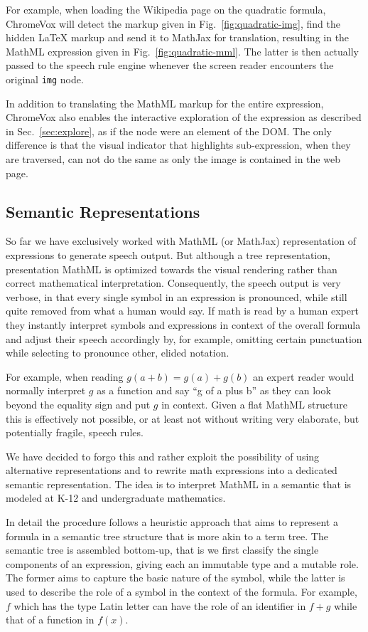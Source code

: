 \documentclass{sig-alternate}
\begin{document}
For example, when loading the Wikipedia page on the quadratic formula, ChromeVox
will detect the markup given in Fig.~\ref{fig:quadratic-img}, find the hidden
{\LaTeX} markup and send it to MathJax for translation, resulting in the MathML
expression given in Fig.~\ref{fig:quadratic-mml}. The latter is then actually
passed to the speech rule engine whenever the screen reader encounters the
original \texttt{img} node.

In addition to translating the MathML markup for the entire expression,
ChromeVox also enables the interactive exploration of the expression as
described in Sec.~\ref{sec:explore}, as if the node were an element of the
DOM. The only difference is that the visual indicator that highlights
sub-expression, when they are traversed, can not do the same as only the image is
contained in the web page.


\subsection{Semantic Representations}
\label{sec:semantic}

So far we have exclusively worked with MathML (or MathJax) representation of
expressions to generate speech output. But although a tree representation,
presentation MathML is optimized towards the visual rendering rather than
correct mathematical interpretation.  Consequently, the speech output is very
verbose, in that every single symbol in an expression is pronounced, while still
quite removed from what a human would say. If math is read by a human
expert they instantly interpret symbols and expressions in context of the
overall formula and adjust their speech accordingly by, for example, omitting
certain punctuation while selecting to pronounce other, elided notation.

For example, when reading $g(a+b)=g(a) + g(b)$ an expert reader would normally
interpret $g$ as a function and say ``g of a plus b'' as they can look beyond the
equality sign and put $g$ in context. Given a flat MathML structure this is
effectively not possible, or at least not without writing very elaborate, but
potentially fragile, speech rules.

We have decided to forgo this and rather exploit the possibility of using
alternative representations and to rewrite math expressions into a dedicated
semantic representation.  The idea is to interpret MathML in a semantic that
is modeled at K-12 and undergraduate mathematics.

In detail the procedure follows a heuristic approach that aims to represent a
formula in a semantic tree structure that is more akin to a term tree. The
semantic tree is assembled bottom-up, that is we first classify the single
components of an expression, giving each an immutable type and a mutable
role. The former aims to capture the basic nature of the symbol, while the
latter is used to describe the role of a symbol in the context of the formula.
For example, $f$ which has the type Latin letter can have the role of an
identifier in $f + g$ while that of a function in $f(x)$.
\end{document}
